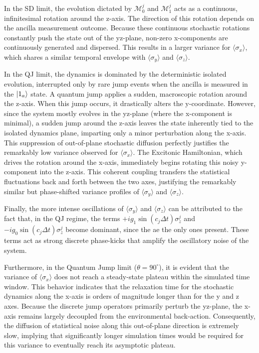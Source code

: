 \documentclass[a4paper,12pt]{article}
\begin{document}
In the SD limit, the evolution dictated by $\mathcal{M}_{0}^{j}$ and $\mathcal{M}_{1}^{j}$ acts as a continuous, infinitesimal rotation around the z-axis. The direction of this rotation depends on the ancilla measurement outcome. Because these continuous stochastic rotations constantly push the state out of the yz-plane, non-zero x-components are continuously generated and dispersed. This results in a larger variance for $\langle \sigma_x \rangle$, which shares a similar temporal envelope with $\langle \sigma_y \rangle$ and $\langle \sigma_z \rangle$.

In the QJ limit, the dynamics is dominated by the deterministic isolated evolution, interrupted only by rare jump events when the ancilla is measured in the $\ket{1_a}$ state. A quantum jump applies a sudden, macroscopic rotation around the z-axis. When this jump occurs, it drastically alters the y-coordinate. However, since the system mostly evolves in the yz-plane (where the x-component is minimal), a sudden jump around the z-axis leaves the state inherently tied to the isolated dynamics plane, imparting only a minor perturbation along the x-axis. This suppression of out-of-plane stochastic diffusion perfectly justifies the remarkably low variance observed for $\langle \sigma_x \rangle$. The Excitonic Hamiltonian, which drives the rotation around the x-axis, immediately begins rotating this noisy y-component into the z-axis. This coherent coupling transfers the statistical fluctuations back and forth between the two axes, justifying the remarkably similar but phase-shifted variance profiles of $\langle \sigma_y \rangle$ and $\langle \sigma_z \rangle$.

Finally, the more intense oscillations of $\langle \sigma_y \rangle$ and $\langle \sigma_z \rangle$ can be attributed to the fact that, in the QJ regime, the terms $+i g_1 \sin(c_j \Delta t)\sigma_z^j$ and $-i g_0 \sin(c_j \Delta t)\sigma_z^j$ become dominant, since the ae the only ones present. These terms act as strong discrete phase-kicks that amplify the oscillatory noise of the system.

Furthermore, in the Quantum Jump limit ($\theta = 90^\circ$), it is evident that the variance of $\langle \sigma_x \rangle$ does not reach a steady-state plateau within the simulated time window. This behavior indicates that the relaxation time for the stochastic dynamics along the x-axis is orders of magnitude longer than for the y and z axes. Because the discrete jump operators primarily perturb the yz-plane, the x-axis remains largely decoupled from the environmental back-action. Consequently, the diffusion of statistical noise along this out-of-plane direction is extremely slow, implying that significantly longer simulation times would be required for this variance to eventually reach its asymptotic plateau.
\end{document}
